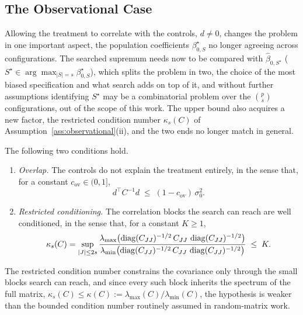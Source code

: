 \subsection{The Observational Case}
\label{sec:observational-extensions}


Allowing the treatment to correlate with the controls, $d \ne 0$,
changes the problem in one important aspect, the population coefficients
$\beta^\star_{0,S}$ no longer agreeing across configurations. The searched
supremum needs now to be compared with $\hat\beta_{0,S^\star}$
($S^\star \in \arg\max_{|S| = s} \beta^\star_{0,S}$), which splits the
problem in two, the choice of the most biased specification and what
search adds on top of it, and without further assumptions identifying
$S^\star$ may be a combinatorial problem over the $\binom{p}{s}$
configurations, out of the scope of this work. The upper bound also
acquires a new factor, the restricted condition number $\kappa_s(C)$ of
Assumption~\ref{ass:observational}(ii), and the two ends no longer match
in general.

\begin{assumption}\label{ass:observational}
The following two conditions hold.
\begin{enumerate}
\item[(i)] \emph{Overlap.} The controls do not explain the treatment
entirely, in the sense that, for a constant
$c_{\mathrm{ov}} \in (0, 1]$,
\begin{equation*}
        d^\top C^{-1} d \;\le\; (1 - c_{\mathrm{ov}})\, \sigma_0^2 .
\end{equation*}
\item[(ii)] \emph{Restricted conditioning.} The correlation blocks the
search can reach are well conditioned, in the sense that, for a constant
$K \ge 1$,
\begin{equation*}
        \kappa_s(C)
        = \sup_{|J| \le 2s}
        \frac{\lambda_{\max}\!\left( \operatorname{diag}(C_{JJ})^{-1/2}\, C_{JJ}\,
        \operatorname{diag}(C_{JJ})^{-1/2} \right)}
        {\lambda_{\min}\!\left( \operatorname{diag}(C_{JJ})^{-1/2}\, C_{JJ}\,
        \operatorname{diag}(C_{JJ})^{-1/2} \right)}
        \;\le\; K .
\end{equation*}
\end{enumerate}
\end{assumption}

The restricted condition number constrains the covariance only
through the small blocks search can reach, and since every such block
inherits the spectrum of the full matrix,
$\kappa_s(C) \le \kappa(C) := \lambda_{\max}(C)/\lambda_{\min}(C)$, the
hypothesis is weaker than the bounded condition number routinely assumed
in random-matrix work.

